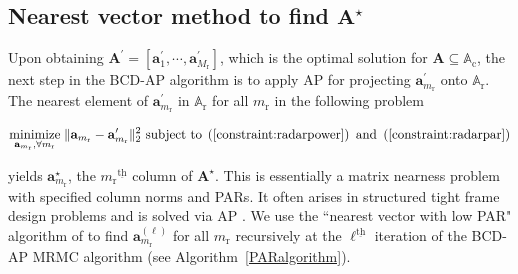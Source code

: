 \documentclass[10pt,journal]{IEEEtran}
\newcommand{\paren}[1]{\left({#1}\right)}
\newcommand{\bracket}[1]{{\left [{#1}\right ]}}
\newcommand{\ith}[1]    {{#1}^{\underline{\text{th}}}}
\newcommand{\rr}{_\mathrm{r}}
\theoremstyle{definition}
\begin{document}
\subsection{Nearest vector method to find $\mathbf{A}^\star$}
\label{subsec: PAR}
Upon obtaining $\mathbf{A}^\prime=\bracket{\mathbf{a}^\prime_{1},\cdots,\mathbf{a}^\prime_{M\rr}}$, which is the optimal solution for $\mathbf{A}\subseteq\mathbb{A}_{\textrm{c}}$, the next step in the BCD-AP algorithm is to apply AP for projecting $\mathbf{a}^\prime_{m\rr}$ onto $\mathbb{A}_{\textrm{r}}$. 
The nearest element of $\mathbf{a}^\prime_{m\rr}$ in $\mathbb{A}_{\textrm{r}}$ for all $m\rr$ in the following problem
\par\noindent\small
\begin{equation}
\label{radarmiop}
\underset{\mathbf{a}_{m\rr},\forall m\rr}{\text{minimize}}\;\lVert\mathbf{a}_{m\rr}-\mathbf{a}^\prime_{m\rr}\rVert^2_2\text{ subject to}\;  \paren{\mathrm{\ref{constraint:radarpower}}}\textrm{ and }\paren{\mathrm{\ref{constraint:radarpar}}}
\end{equation}\normalsize

yields $\mathbf{a}^\star_{m\rr}$, the $\ith{m\rr}$ column of $\mathbf{A}^\star$. This is essentially a matrix nearness problem with specified column norms and PARs. It often arises in structured tight frame design problems and is solved via AP \cite{nearestvector,arXiv180203889Z}. We use the ``nearest vector with low PAR" algorithm of \cite{nearestvector} to find $\mathbf{a}^{\paren{\ell}}_{m\rr}$ for all $m\rr$ recursively at the $\ith{\ell}$ iteration of the BCD-AP MRMC algorithm (see Algorithm~\ref{PARalgorithm}).
\end{document}
